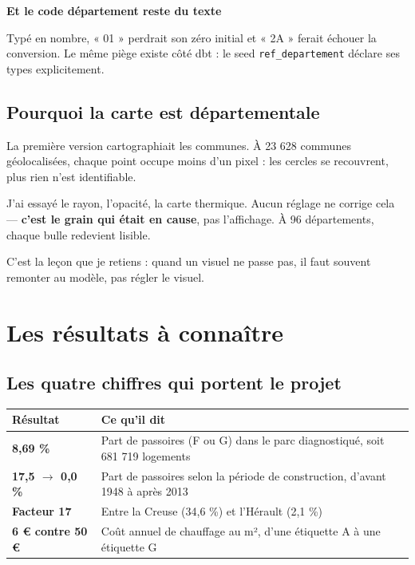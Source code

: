 \documentclass[11pt,a4paper]{article}
\newcommand{\cmd}[1]{\texttt{\small #1}}
\newcommand{\titrebloc}[1]{\textbf{\color{encre}#1}\par\vspace{0.25em}}
\begin{document}
\begin{pourquoi}
\titrebloc{Et le code département reste du texte}
Typé en nombre, « 01 » perdrait son zéro initial et « 2A » ferait échouer la
conversion. Le même piège existe côté dbt : le seed \cmd{ref\_departement}
déclare ses types explicitement.
\end{pourquoi}

\subsection{Pourquoi la carte est départementale}

\begin{pourquoi}
La première version cartographiait les communes. À 23 628 communes
géolocalisées, chaque point occupe moins d'un pixel : les cercles se
recouvrent, plus rien n'est identifiable.

J'ai essayé le rayon, l'opacité, la carte thermique. Aucun réglage ne corrige
cela — \textbf{c'est le grain qui était en cause}, pas l'affichage. À 96
départements, chaque bulle redevient lisible.

C'est la leçon que je retiens : quand un visuel ne passe pas, il faut souvent
remonter au modèle, pas régler le visuel.
\end{pourquoi}

\newpage
\section{Les résultats à connaître}

\subsection{Les quatre chiffres qui portent le projet}

\begin{center}
\begin{tabularx}{\textwidth}{@{}lX@{}}
\toprule
\textbf{Résultat} & \textbf{Ce qu'il dit} \\
\midrule
\textbf{8,69 \%} & Part de passoires (F ou G) dans le parc diagnostiqué, soit 681 719 logements \\
\textbf{17,5 $\rightarrow$ 0,0 \%} & Part de passoires selon la période de construction, d'avant 1948 à après 2013 \\
\textbf{Facteur 17} & Entre la Creuse (34,6 \%) et l'Hérault (2,1 \%) \\
\textbf{6 € contre 50 €} & Coût annuel de chauffage au m², d'une étiquette A à une étiquette G \\
\bottomrule
\end{tabularx}
\end{center}
\end{document}
